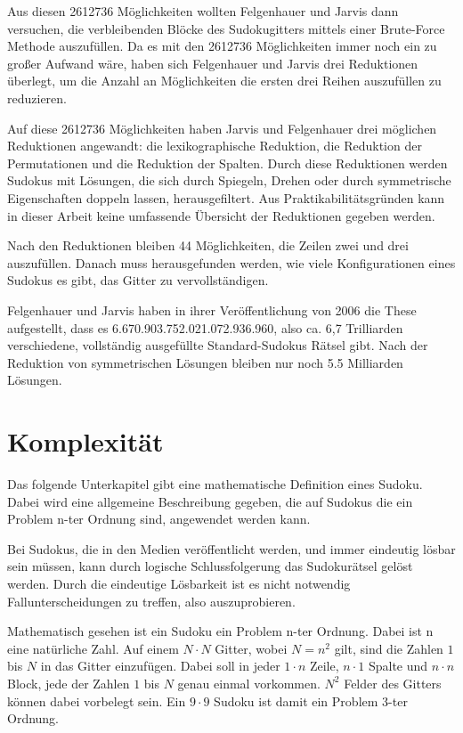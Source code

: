 Aus diesen 2612736 Möglichkeiten wollten Felgenhauer und Jarvis dann versuchen, die verbleibenden Blöcke des Sudokugitters mittels einer Brute-Force Methode auszufüllen. Da es mit den 2612736 Möglichkeiten immer noch ein zu großer Aufwand wäre, haben sich Felgenhauer und Jarvis drei Reduktionen überlegt, um die Anzahl an Möglichkeiten die ersten drei Reihen auszufüllen zu reduzieren.

Auf diese 2612736 Möglichkeiten haben Jarvis und Felgenhauer drei möglichen Reduktionen angewandt: die lexikographische Reduktion, die Reduktion der Permutationen und die Reduktion der Spalten. Durch diese Reduktionen werden Sudokus mit Lösungen, die sich durch Spiegeln, Drehen oder durch symmetrische Eigenschaften doppeln lassen, herausgefiltert. Aus Praktikabilitätsgründen kann in dieser Arbeit keine umfassende Übersicht der Reduktionen gegeben werden.

Nach den Reduktionen bleiben 44 Möglichkeiten, die Zeilen zwei und drei auszufüllen. Danach muss herausgefunden werden, wie viele Konfigurationen eines Sudokus es gibt, das Gitter zu vervollständigen. 

Felgenhauer und Jarvis haben in ihrer Veröffentlichung von 2006 die These aufgestellt, dass es 6.670.903.752.021.072.936.960, also ca. 6,7 Trilliarden  verschiedene, vollständig ausgefüllte Standard-Sudokus Rätsel gibt. Nach der Reduktion von symmetrischen Lösungen bleiben nur noch 5.5 Milliarden Lösungen. \cite{FelgenhauerJarvis} \cite[90\psqq]{althofer2014spiele}

\section{Komplexität}
Das folgende Unterkapitel gibt eine mathematische Definition eines Sudoku. Dabei wird eine allgemeine Beschreibung gegeben, die auf Sudokus die ein Problem n-ter Ordnung sind, angewendet werden kann.

Bei Sudokus, die in den Medien veröffentlicht werden, und immer eindeutig lösbar sein müssen, kann durch logische Schlussfolgerung das Sudokurätsel gelöst werden. Durch die eindeutige Lösbarkeit ist es nicht notwendig Fallunterscheidungen zu treffen, also auszuprobieren.

Mathematisch gesehen ist ein Sudoku ein Problem n-ter Ordnung. Dabei ist n eine natürliche Zahl. Auf einem $N\cdot N$ Gitter, wobei $N=n^2$ gilt, sind die Zahlen $1$ bis $N$ in das Gitter einzufügen. Dabei soll in jeder $1\cdot n$ Zeile, $n\cdot 1$ Spalte und $n\cdot n$ Block, jede der Zahlen $1$ bis $N$ genau einmal vorkommen. $N^2$ Felder des Gitters können dabei vorbelegt sein. Ein $9\cdot9$ Sudoku ist damit ein Problem 3-ter Ordnung. \cite{HerzbergMurty} 

